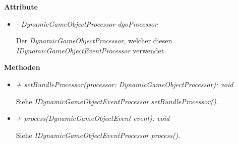             \textbf{Attribute}
            \begin{itemize}
                \item  \textit{- DynamicGameObjectProcessor dgoProcessor}
                    \begin{leftbar}[0.9\linewidth]
                        Der \textit{DynamicGameObjectProcessor}, welcher diesen \textit{IDynamicGameObjectEventProcessor} verwendet.
                    \end{leftbar}
            \end{itemize}
            \textbf{Methoden}
            \begin{itemize}
                \item \textit{+ setBundleProcessor(processor: DynamicGameObjectProcessor): void}
                    \begin{leftbar}[0.9\linewidth]
                        Siehe \textit{IDynamicGameObjectEventProcessor.setBundleProcessor()}.
                    \end{leftbar}
                \item \textit{+ process(DynamicGameObjectEvent event): void}
                    \begin{leftbar}[0.9\linewidth]
                        Siehe \textit{IDynamicGameObjectEventProcessor.process()}.
                    \end{leftbar}
            \end{itemize}